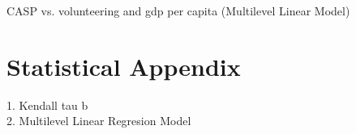 \documentclass[10pt, letterpaper]{article}
\begin{document}
\begin{spacing}{1.4}
\begin{spacing}{.9}

\begin{spacing}{.9}
	 
      \label{tauH} 
\end{spacing}

\begin{spacing}{.9}
	 
      \label{tauLS} 
\end{spacing}


%	 




\begin{spacing}{.9}
\begin{table}[H]
\centering 
\caption{CASP vs. volunteering and gdp per capita (Multilevel Linear Model)}  
\begin{scriptsize} 
	 
      \label{regB} 
\end{scriptsize}
\end{table}
\end{spacing}

\section{Statistical Appendix}

1. Kendall tau b \\
2. Multilevel Linear Regresion Model

\end{spacing}
\end{spacing}
\end{document}
